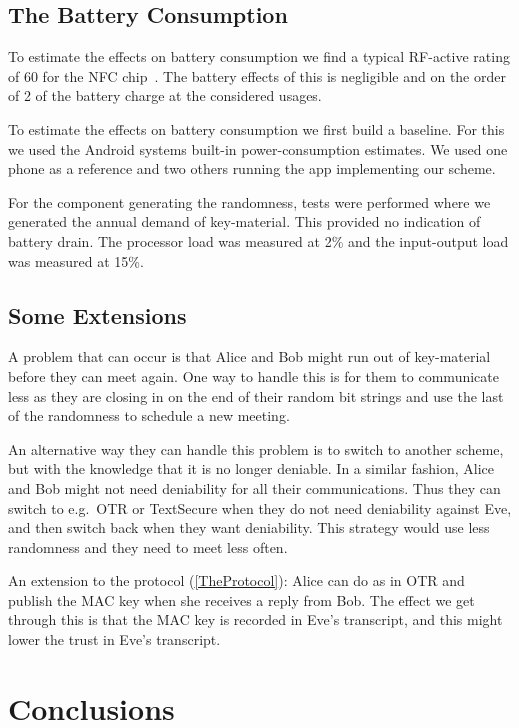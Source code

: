\subsection{The Battery Consumption}
\label{BatteryConsumption}
To estimate the effects on battery consumption we find a typical RF-active 
rating of \unit{60}{\milli\ampere} for the NFC chip~\cite{NFCController}.
The battery effects of this is negligible and on the order of 
\unit{2}{\text{\textperthousand}} of the battery charge at the considered 
usages.

To estimate the effects on battery consumption we first build a baseline.
For this we used the Android systems built-in power-consumption estimates.
We used one phone as a reference and two others running the app implementing 
our scheme.

For the component generating the randomness, tests were performed where we 
generated the annual demand of key-material.
This provided no indication of battery drain.
The processor load was measured at \unit{2}{\%} and the input-output load was 
  measured at \unit{15}{\%}. 

\subsection{Some Extensions}

A problem that can occur is that Alice and Bob might run out of key-material 
before they can meet again.
One way to handle this is for them to communicate less as they are closing in 
on the end of their random bit strings and use the last of the randomness to 
schedule a new meeting.

An alternative way they can handle this problem is to switch to another scheme, 
but with the knowledge that it is no longer deniable.
In a similar fashion, Alice and Bob might not need deniability for all their 
communications.
Thus they can switch to e.g.~\ac{OTR} or TextSecure when they do not need 
deniability against Eve, and then switch back when they want deniability.
This strategy would use less randomness and they need to meet less often.

An extension to the protocol (\cref{TheProtocol}): Alice can do as in \ac{OTR} 
and publish the \ac{MAC} key when she receives a reply from Bob.
The effect we get through this is that the \ac{MAC} key is recorded in Eve's 
transcript, and this might lower the trust in Eve's transcript.


\section{Conclusions}
\label{Conclusions}

